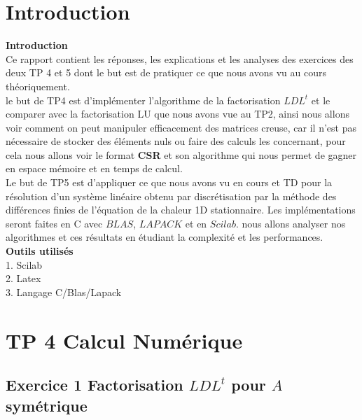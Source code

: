 \documentclass[12pt]{report}
\begin{document}

\pagebreak
\normalsize
\hypersetup{pdfborder=0 0 0}
\tableofcontents
\renewcommand{\footrulewidth}{1pt}


\chapter{Introduction}
\textbf{Introduction}\\


Ce rapport contient les réponses, les explications et les analyses des exercices des deux TP 4 et 5 dont le but est de pratiquer ce que nous avons vu au cours théoriquement.\\

le but de TP4 est d'implémenter l'algorithme de la factorisation $LDL^t$ et le comparer avec la factorisation LU que nous avons vue au TP2, ainsi nous allons voir comment on peut manipuler efficacement des matrices creuse, car il n'est pas nécessaire de stocker des éléments nuls ou faire des calculs les concernant, pour cela nous allons voir le format \textbf{CSR} et son algorithme qui nous permet de gagner en espace mémoire et en temps de calcul.\\

Le but de TP5 est d'appliquer ce que nous avons vu en cours et TD pour la résolution d'un système linéaire obtenu par discrétisation par la méthode des différences finies de l'équation de la chaleur 1D stationnaire. Les implémentations
seront faites en C avec $BLAS$, $LAPACK$ et en $Scilab$. 
nous allons analyser nos algorithmes et ces résultats en étudiant la complexité et les performances.\\

\textbf{Outils utilisés}\\[0.5cm]
1. Scilab\\
2. Latex\\
3. Langage C/Blas/Lapack



\chapter{TP 4 Calcul Numérique}
\section{Exercice 1 Factorisation $LDL^t$ pour $A$ symétrique}
\end{document}
